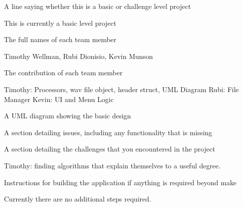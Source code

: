 A line saying whether this is a basic or challenge level project \begin{DoxyVerb}This is currently a basic level project
\end{DoxyVerb}


The full names of each team member \begin{DoxyVerb}Timothy Wellman, Rubi Dionisio, Kevin Munson
\end{DoxyVerb}


The contribution of each team member \begin{DoxyVerb}Timothy: Processors, wav file object, header struct, UML Diagram
Rubi: File Manager
Kevin: UI and Menu Logic
\end{DoxyVerb}


A U\+ML diagram showing the basic design



A section detailing issues, including any functionality that is missing

A section detailing the challenges that you encountered in the project \begin{DoxyVerb}Timothy: finding algorithms that explain themselves to a useful degree.
\end{DoxyVerb}


Instructions for building the application if anything is required beyond make \begin{DoxyVerb}Currently there are no additional steps required.
\end{DoxyVerb}
 